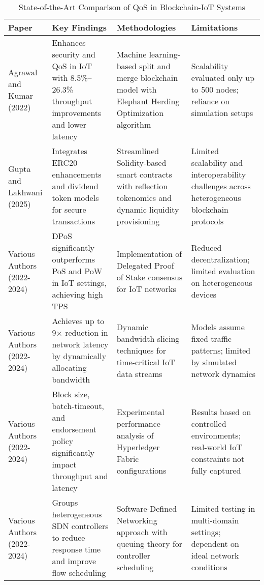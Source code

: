 \documentclass[12pt,onecolumn]{IEEEtran} %
\newcommand{\fitToPage}[1]{\begin{adjustbox}{max width=\textwidth}#1\end{adjustbox}}
\renewcommand{\arraystretch}{1.2} %
\begin{document}
\begin{table}[H]
\caption{State-of-the-Art Comparison of QoS in Blockchain-IoT Systems}
\label{table6}
\centering
\fitToPage{
\begingroup
\setlength{\tabcolsep}{4pt}
\renewcommand{\arraystretch}{1.15}
\footnotesize
\begin{tabularx}{\textwidth}{@{}P{0.18\textwidth}YYY@{}}
\toprule
\textbf{Paper} & \textbf{Key Findings} & \textbf{Methodologies} & \textbf{Limitations} \\
\midrule
Agrawal and Kumar (2022) & Enhances security and QoS in IoT with 8.5\%--26.3\% throughput improvements and lower latency & Machine learning-based split and merge blockchain model with Elephant Herding Optimization algorithm & Scalability evaluated only up to 500 nodes; reliance on simulation setups \\
\addlinespace
Gupta and Lakhwani (2025) & Integrates ERC20 enhancements and dividend token models for secure transactions & Streamlined Solidity-based smart contracts with reflection tokenomics and dynamic liquidity provisioning & Limited scalability and interoperability challenges across heterogeneous blockchain protocols \\
\addlinespace
Various Authors (2022-2024) & DPoS significantly outperforms PoS and PoW in IoT settings, achieving high TPS & Implementation of Delegated Proof of Stake consensus for IoT networks & Reduced decentralization; limited evaluation on heterogeneous devices \\
\addlinespace
Various Authors (2022-2024) & Achieves up to 9$\times$ reduction in network latency by dynamically allocating bandwidth & Dynamic bandwidth slicing techniques for time-critical IoT data streams & Models assume fixed traffic patterns; limited by simulated network dynamics \\
\addlinespace
Various Authors (2022-2024) & Block size, batch-timeout, and endorsement policy significantly impact throughput and latency & Experimental performance analysis of Hyperledger Fabric configurations & Results based on controlled environments; real-world IoT constraints not fully captured \\
\addlinespace
Various Authors (2022-2024) & Groups heterogeneous SDN controllers to reduce response time and improve flow scheduling & Software-Defined Networking approach with queuing theory for controller scheduling & Limited testing in multi-domain settings; dependent on ideal network conditions \\
\bottomrule
\end{tabularx}
\endgroup
}
\end{table}
\end{document}
